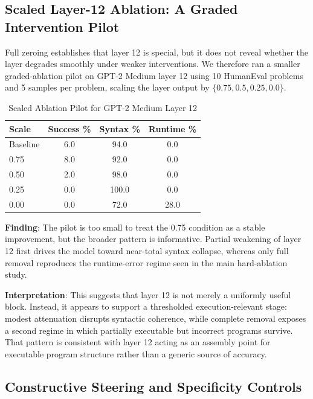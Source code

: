 \documentclass[preprint,12pt,authoryear]{elsarticle}
\begin{document}
\subsection{Scaled Layer-12 Ablation: A Graded Intervention Pilot}

Full zeroing establishes that layer 12 is special, but it does not reveal whether the layer degrades smoothly under weaker interventions. We therefore ran a smaller graded-ablation pilot on GPT-2 Medium layer 12 using 10 HumanEval problems and 5 samples per problem, scaling the layer output by $\{0.75, 0.5, 0.25, 0.0\}$.

\begin{table}[t]
\centering
\caption{Scaled Ablation Pilot for GPT-2 Medium Layer 12}
\label{tab:scaled_layer12}
\footnotesize
\begin{tabular}{@{}lccc@{}}
\toprule
\textbf{Scale} & \textbf{Success \%} & \textbf{Syntax \%} & \textbf{Runtime \%} \\
\midrule
Baseline & 6.0 & 94.0 & 0.0 \\
0.75 & 8.0 & 92.0 & 0.0 \\
0.50 & 2.0 & 98.0 & 0.0 \\
0.25 & 0.0 & 100.0 & 0.0 \\
0.00 & 0.0 & 72.0 & 28.0 \\
\bottomrule
\end{tabular}
\end{table}

\textbf{Finding}: The pilot is too small to treat the 0.75 condition as a stable improvement, but the broader pattern is informative. Partial weakening of layer 12 first drives the model toward near-total syntax collapse, whereas only full removal reproduces the runtime-error regime seen in the main hard-ablation study.

\textbf{Interpretation}: This suggests that layer 12 is not merely a uniformly useful block. Instead, it appears to support a thresholded execution-relevant stage: modest attenuation disrupts syntactic coherence, while complete removal exposes a second regime in which partially executable but incorrect programs survive. That pattern is consistent with layer 12 acting as an assembly point for executable program structure rather than a generic source of accuracy.

\subsection{Constructive Steering and Specificity Controls}
\end{document}
